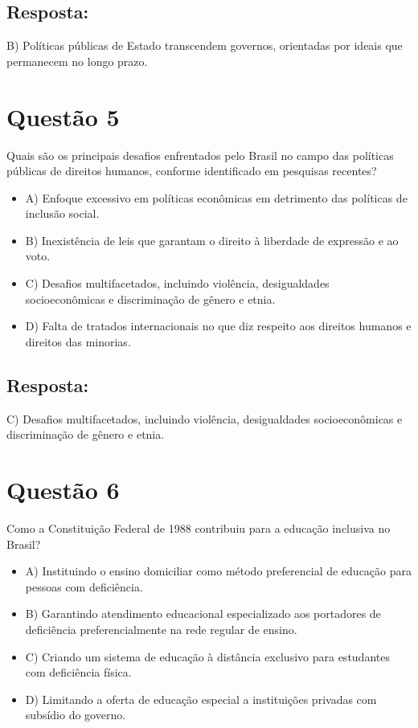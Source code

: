 \documentclass[
   article,       
   12pt,          
   oneside,       
   a4paper,       
   english,       
   brazil,        
   sumario=tradicional
   ]{abntex2}
\begin{document}
\subsection{Resposta:}
B) Políticas públicas de Estado transcendem governos, orientadas por ideais que permanecem no longo prazo.

\section{Questão 5}
Quais são os principais desafios enfrentados pelo Brasil no campo das políticas públicas de direitos humanos, conforme identificado em pesquisas recentes?
\begin{itemize}
    \item A) Enfoque excessivo em políticas econômicas em detrimento das políticas de inclusão social.
    \item B) Inexistência de leis que garantam o direito à liberdade de expressão e ao voto.
    \item C) Desafios multifacetados, incluindo violência, desigualdades socioeconômicas e discriminação de gênero e etnia.
    \item D) Falta de tratados internacionais no que diz respeito aos direitos humanos e direitos das minorias.
\end{itemize}
\subsection{Resposta:}
C) Desafios multifacetados, incluindo violência, desigualdades socioeconômicas e discriminação de gênero e etnia.

\section{Questão 6}
Como a Constituição Federal de 1988 contribuiu para a educação inclusiva no Brasil?
\begin{itemize}
    \item A) Instituindo o ensino domiciliar como método preferencial de educação para pessoas com deficiência.
    \item B) Garantindo atendimento educacional especializado aos portadores de deficiência preferencialmente na rede regular de ensino.
    \item C) Criando um sistema de educação à distância exclusivo para estudantes com deficiência física.
    \item D) Limitando a oferta de educação especial a instituições privadas com subsídio do governo.
\end{itemize}
\end{document}
